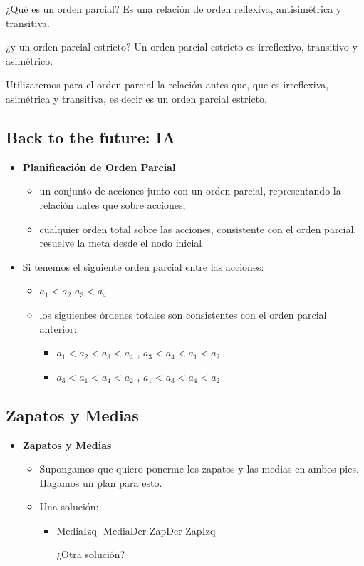 \documentclass[11pt]{article}
\begin{document}
{\color{red}¿Qué es un orden parcial?}
Es una relación de orden reflexiva, antisimétrica y transitiva.

{\color{red}¿y un orden parcial estricto?}
Un orden parcial estricto es irreflexivo, transitivo y asimétrico.

Utilizaremos para el orden parcial la relación {\color{red}antes que},
que es irreflexiva, asimétrica y transitiva, es decir es un
{\color{red}orden parcial estricto}.

\subsection*{Back to the future: IA}
\label{sec:orgb4147e4}
\begin{itemize}
\item \textbf{{\color{green}Planificación de Orden Parcial}}
\begin{itemize}
\item un conjunto de {\color{red}acciones} junto con un {\color{red}orden parcial},
representando la relación {\color{blue}antes que} sobre acciones,
\item cualquier orden total sobre las acciones, consistente con el
orden parcial, resuelve la meta desde el nodo inicial
\end{itemize}
\item Si tenemos el siguiente orden parcial entre las acciones:
\begin{itemize}
\item \(a_1 < a_2\)  \(a_3 < a_4\)
\item los siguientes órdenes totales son {\color{red}consistentes} con el orden parcial anterior:
\begin{itemize}
\item \(a_1 < a_2 < a_3 < a_4\) , \(a_3 < a_4 < a_1 < a_2\)
\item \(a_3 < a_1 < a_4 < a_2\) , \(a_1 < a_3 < a_4 < a_2\)
\end{itemize}
\end{itemize}
\end{itemize}

\subsection*{Zapatos y Medias}
\label{sec:orgbe0588f}

\begin{itemize}
\item \textbf{{\color{green}Zapatos y Medias}}
\begin{itemize}
\item Supongamos que quiero ponerme los zapatos y las medias en ambos pies. Hagamos un plan para esto.
\item Una solución:
\begin{itemize}
\item MediaIzq- MediaDer-ZapDer-ZapIzq      

¿Otra solución?
\end{itemize}
\end{itemize}
\end{itemize}
\end{document}
